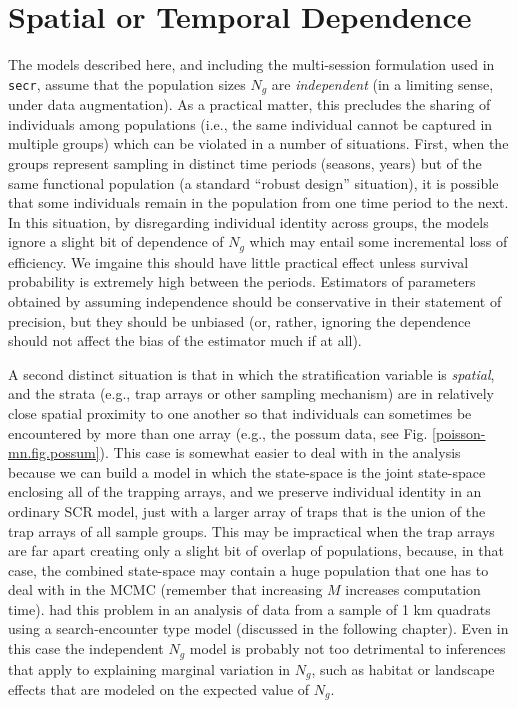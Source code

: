 \section{Spatial or Temporal Dependence}

The models described here, and including the multi-session formulation
used in \mbox{\tt secr}, assume that the population sizes $N_{g}$ are
{\it independent} (in a limiting sense, under data augmentation).  As
a practical matter, this precludes the sharing of individuals among
populations (i.e., the same individual cannot be captured in multiple
groups) which can be violated in a number of situations.  First, when
the groups represent sampling in distinct time periods (seasons,
years) but of the same functional population (a standard ``robust
design'' situation), it is possible that some individuals remain in
the population from one time period to the next.  In this situation,
by disregarding individual identity across groups, the models ignore a
slight bit of dependence of $N_{g}$ which may entail some incremental
loss of efficiency. We imgaine this should have little practical
effect unless survival probability is extremely high between the
periods.  Estimators of parameters obtained by assuming independence
should be conservative in their statement of precision, but they
should be unbiased (or, rather, ignoring the dependence should not
affect the bias of the estimator much if at all).

A second distinct situation is that in which the stratification
variable is {\it spatial}, and the strata (e.g., trap arrays or other
sampling mechanism) are in relatively close spatial proximity to one
another so that individuals can sometimes be encountered by more than
one array (e.g., the possum data, see
Fig. \ref{poisson-mn.fig.possum}). This case is somewhat easier to
deal with in the analysis because we can build a model in which the
state-space is the joint state-space enclosing all of the trapping
arrays, and we preserve individual identity in an ordinary SCR model,
just with a larger array of traps that is the union of the trap arrays
of all sample groups. This may be impractical when the trap arrays are
far apart creating only a slight bit of overlap of populations,
because, in that case, the combined state-space may contain a huge
population that one has to deal with in the MCMC (remember that
increasing $M$ increases computation time).
\citep{royle_etal:2011mee} had this problem in an analysis of data
from a sample of 1 km quadrats using a search-encounter type model
(discussed in the following chapter).  Even in this case the
independent $N_{g}$ model is probably not too detrimental to
inferences that apply to explaining marginal variation in $N_{g}$,
such as habitat or landscape effects that are modeled on the expected
value of $N_{g}$.

